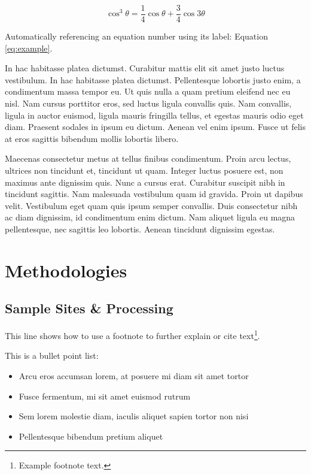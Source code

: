 \documentclass[
	a4paper, %
	10pt, %
	unnumberedsections, %
	twoside, %
]{LTJournalArticle}
\begin{document}
\begin{equation}
	\cos^3 \theta =\frac{1}{4}\cos\theta+\frac{3}{4}\cos 3\theta
	\label{eq:example}
\end{equation}

Automatically referencing an equation number using its label: Equation \ref{eq:example}.

In hac habitasse platea dictumst. Curabitur mattis elit sit amet justo luctus vestibulum. In hac habitasse platea dictumst. Pellentesque lobortis justo enim, a condimentum massa tempor eu. Ut quis nulla a quam pretium eleifend nec eu nisl. Nam cursus porttitor eros, sed luctus ligula convallis quis. Nam convallis, ligula in auctor euismod, ligula mauris fringilla tellus, et egestas mauris odio eget diam. Praesent sodales in ipsum eu dictum. Aenean vel enim ipsum. Fusce ut felis at eros sagittis bibendum mollis lobortis libero.

Maecenas consectetur metus at tellus finibus condimentum. Proin arcu lectus, ultrices non tincidunt et, tincidunt ut quam. Integer luctus posuere est, non maximus ante dignissim quis. Nunc a cursus erat. Curabitur suscipit nibh in tincidunt sagittis. Nam malesuada vestibulum quam id gravida. Proin ut dapibus velit. Vestibulum eget quam quis ipsum semper convallis. Duis consectetur nibh ac diam dignissim, id condimentum enim dictum. Nam aliquet ligula eu magna pellentesque, nec sagittis leo lobortis. Aenean tincidunt dignissim egestas.


\section{Methodologies}

\subsection{Sample Sites \& Processing}

This line shows how to use a footnote to further explain or cite text\footnote{Example footnote text.}.

This is a bullet point list:

\begin{itemize}
	\item Arcu eros accumsan lorem, at posuere mi diam sit amet tortor
	\item Fusce fermentum, mi sit amet euismod rutrum
	\item Sem lorem molestie diam, iaculis aliquet sapien tortor non nisi
	\item Pellentesque bibendum pretium aliquet
\end{itemize}
\end{document}
